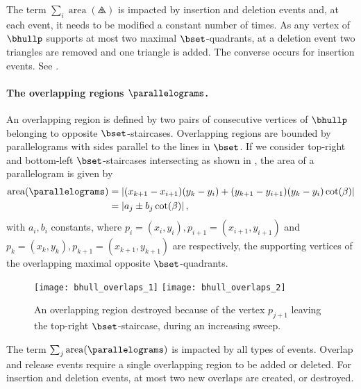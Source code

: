 \documentclass[11pt,letterpaper,english]{article}
\theoremstyle{definition}
\newcommand{\area}{\operatorname{area}}
\begin{document}
The term $\sum_i \area(\triangles)$ is impacted by insertion and
deletion events and, at each event, it needs to be modified a constant
number of times. As any vertex of $\bhullp$ supports at most two
maximal $\bset$-quadrants, at a deletion event two triangles are
removed and one triangle is added. The converse occurs for insertion
events. See .

\paragraph{The overlapping regions $\parallelograms$.}

An overlapping region is defined by two pairs of consecutive vertices
of $\bhullp$ belonging to opposite $\bset$-staircases. Overlapping
regions are bounded by parallelograms with sides parallel to the lines
in $\bset$. If we consider top-right and bottom-left
$\bset$-staircases intersecting as shown in
, the area of a parallelogram is
given by
\begin{align}
  \label{apps:area:eqn:or_area}
  \area(\parallelograms) &= \left| (x_{k+1} - x_{i+1})(y_{k} - y_{i})
                           + (y_{k+1} - y_{i+1})(y_{k} - y_{i})\cot(\beta) \right| \nonumber \\
                         &= \left| a_j \pm b_j \cot(\beta) \right|,
\end{align}
with $a_i, b_i$ constants, where $p_i=(x_i,y_i),p_{i+1}=(x_{i+1},y_{i+1})$ and
$p_k=(x_k,y_k),p_{k+1}=(x_{k+1},y_{k+1})$ are respectively, the
supporting vertices of the overlapping maximal opposite
$\bset$-quadrants.

\begin{figure}[ht]
  \centering
  \subcaptionbox{\label{apps:area:fig:parallelogram:1}}
  {\texttt{[image: bhull\_overlaps\_1]}}
  \hspace{1.5cm}
  \subcaptionbox{\label{apps:area:fig:parallelogram:2}}
  {\texttt{[image: bhull\_overlaps\_2]}}
  \caption{An overlapping region destroyed because of the vertex
    $p_{j+1}$ leaving the top-right $\bset$-staircase, during an
    increasing sweep.}
  \label{apps:area:fig:parallelogram}
\end{figure}

The term $\sum_j \area(\parallelograms)$ is impacted by all types of
events. Overlap and release events require a single overlapping
region to be added or deleted. For insertion and deletion events, at
most two new overlaps are created, or destroyed.
\end{document}
